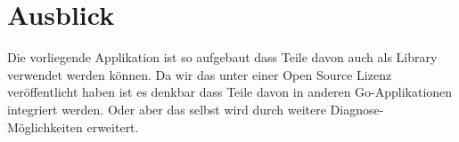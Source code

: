 \section*{Ausblick}
Die vorliegende Applikation ist so aufgebaut dass Teile davon auch als Library verwendet werden können. Da wir das \tool unter einer Open Source Lizenz veröffentlicht haben ist es denkbar dass Teile davon in anderen Go-Applikationen integriert werden. Oder aber das \tool selbst wird durch weitere Diagnose-Möglichkeiten erweitert.